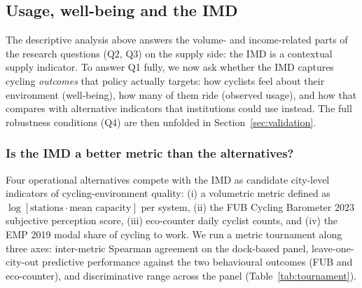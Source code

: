 \documentclass[11pt,a4paper]{article}
\begin{document}
\subsection{Usage, well-being and the IMD}
\label{sec:results-usage}

The descriptive analysis above answers the volume- and
income-related parts of the research questions (Q2, Q3) on the
supply side: the IMD is a contextual supply indicator. To answer
Q1 fully, we now ask whether the IMD captures cycling
\emph{outcomes} that policy actually targets: how cyclists feel
about their environment (well-being), how many of them ride
(observed usage), and how that compares with alternative
indicators that institutions could use instead. The full
robustness conditions (Q4) are then unfolded in
Section~\ref{sec:validation}.

\subsubsection{Is the IMD a better metric than the alternatives?}
\label{sec:results-tournament}

Four operational alternatives compete with the IMD as candidate
city-level indicators of cycling-environment quality: (i) a
volumetric metric defined as $\log[\text{stations} \cdot
\text{mean capacity}]$ per system, (ii) the FUB Cycling Barometer
2023 subjective perception score, (iii) eco-counter daily cyclist
counts, and (iv) the EMP 2019 modal share of cycling to work. We
run a metric tournament along three axes: inter-metric Spearman
agreement on the dock-based panel, leave-one-city-out predictive
performance against the two behavioural outcomes (FUB and
eco-counter), and discriminative range across the panel
(Table~\ref{tab:tournament}).
\end{document}
